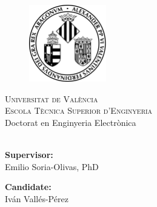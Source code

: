 \makeatletter
\begin{titlepage}
	\begin{figure}[t]
		\centering\includegraphics[width=0.3\textwidth]{titlepage/images/logo}
	\end{figure}
	\begin{center}
		\textsc{ \LARGE{Universitat de València \\}}
		\textsc{ \LARGE{Escola Tècnica Superior d'Enginyeria\\ }}
		\textnormal{ \LARGE{Doctorat en Enginyeria Electrònica\\}}
		\vspace{30mm}
		\fontsize{10mm}{7mm}\selectfont 
		\textup{\@title}\\
	\end{center}
	
	\vspace{25mm}
	
	\begin{minipage}[t]{0.47\textwidth}
		\textnormal{\large{\bf Supervisor:\\}}
		{\large Emilio Soria-Olivas, PhD}
	\end{minipage}\hfill\begin{minipage}[t]{0.47\textwidth}\raggedleft
		\textnormal{\large{\bf Candidate:\\}}
		{\large Iván Vallés-Pérez}
	\end{minipage}
	
	\vspace{20mm}
	
	
\end{titlepage}
\makeatother